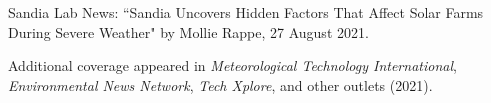 \documentclass{article}[12pt]
\begin{document}
\begin{etaremune}[]
		
		
		\item Sandia Lab News: ``Sandia Uncovers Hidden Factors That Affect Solar Farms During Severe Weather" by Mollie Rappe, 27 August 2021.
		
		\item Additional coverage appeared in \textit{Meteorological Technology International}, \textit{Environmental News Network}, \textit{Tech Xplore}, and other outlets (2021).
		
	\end{etaremune}
	
	
	
\end{document}
